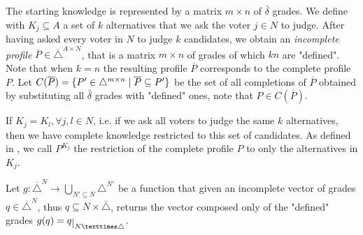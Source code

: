 \documentclass[version=3.21, pagesize, twoside=off, bibliography=totoc, DIV=calc, fontsize=12pt, a4paper]{scrartcl}
\begin{document}
The starting knowledge is represented by a matrix $m\times n$ of $\bar{\delta}$ grades. We define with $K_j \subseteq A$ a set of $k$ alternatives that we ask the voter $j\in N$ to judge. 
After having asked every voter in $N$ to judge $k$ candidates, we obtain an \emph{incomplete profile} $\overline{P}\in \overline{\triangle}^{A \times N}$, that is a matrix $m \times n$ of grades of which $kn$ are "defined".
Note that when $k=n$ the resulting profile $\overline{P}$ corresponds to the complete profile $P$. Let $C(\overline{P}) = \{P' \in \triangle^{m \times n} \suchthat \overline{P} \subseteq P'\}$ be the set of all completions of $\overline{P}$ obtained by substituting all $\bar{\delta}$ grades with "defined" ones, note that $P \in C(\overline{P})$.
 
If $K_j=K_l, \forall j,l\in N$, i.e. 
if we ask all voters to judge the same $k$ alternatives, then we have complete knowledge restricted to this set of candidates. As defined in , we call $P^{K_j}$ the restriction of the complete profile $P$ to only the alternatives in $K_j$.

Let $g:\overline{\triangle}^N\rightarrow \bigcup_{N' \subseteq N}\triangle^{N'}$ be a function that given an incomplete vector of grades $q \in \overline{\triangle}^N$, thus $q \subseteq N × \bar{\triangle}$, returns the vector composed only of the "defined" grades $g(q) = \restr{q}{N × \triangle}$.

\end{document}
